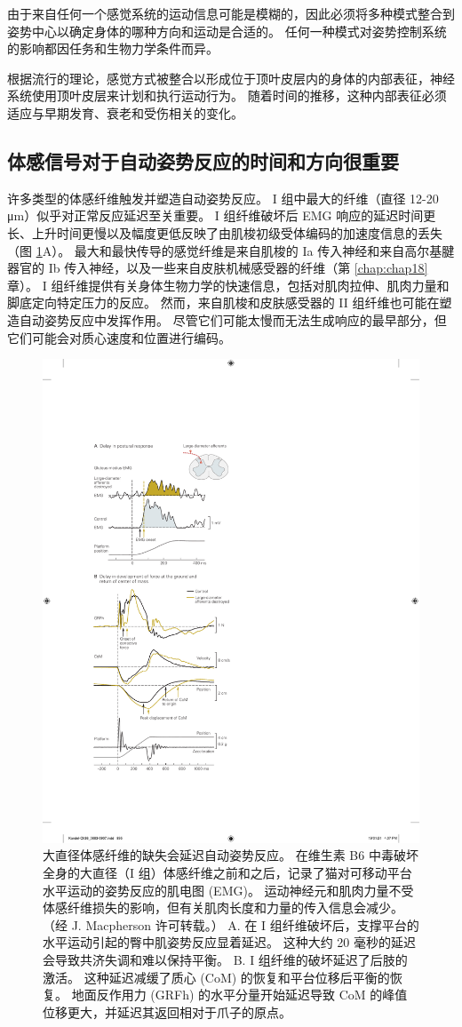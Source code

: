 由于来自任何一个感觉系统的运动信息可能是模糊的，因此必须将多种模式整合到姿势中心以确定身体的哪种方向和运动是合适的。
任何一种模式对姿势控制系统的影响都因任务和生物力学条件而异。


根据流行的理论，感觉方式被整合以形成位于顶叶皮层内的身体的内部表征，神经系统使用顶叶皮层来计划和执行运动行为。
随着时间的推移，这种内部表征必须适应与早期发育、衰老和受伤相关的变化。



\subsection{体感信号对于自动姿势反应的时间和方向很重要}

许多类型的体感纤维触发并塑造自动姿势反应。
I 组中最大的纤维（直径 12-20 μm）似乎对正常反应延迟至关重要。
I 组纤维破坏后 EMG 响应的延迟时间更长、上升时间更慢以及幅度更低反映了由肌梭初级受体编码的加速度信息的丢失（图 \ref{fig:36_9}A）。
最大和最快传导的感觉纤维是来自肌梭的 Ia 传入神经和来自高尔基腱器官的 Ib 传入神经，以及一些来自皮肤机械感受器的纤维（第 \ref{chap:chap18} 章）。
I 组纤维提供有关身体生物力学的快速信息，包括对肌肉拉伸、肌肉力量和脚底定向特定压力的反应。
然而，来自肌梭和皮肤感受器的 II 组纤维也可能在塑造自动姿势反应中发挥作用。
尽管它们可能太慢而无法生成响应的最早部分，但它们可能会对质心速度和位置进行编码。


\begin{figure}[htbp]
	\centering
	\includegraphics[width=0.5\linewidth]{chap36/fig_36_9}
	\caption{大直径体感纤维的缺失会延迟自动姿势反应。 在维生素 B6 中毒破坏全身的大直径（I 组）体感纤维之前和之后，记录了猫对可移动平台水平运动的姿势反应的肌电图 (EMG)。 运动神经元和肌肉力量不受体感纤维损失的影响，但有关肌肉长度和力量的传入信息会减少。 （经 J. Macpherson 许可转载。） A. 在 I 组纤维破坏后，支撑平台的水平运动引起的臀中肌姿势反应显着延迟。 这种大约 20 毫秒的延迟会导致共济失调和难以保持平衡。 B. I 组纤维的破坏延迟了后肢的激活。 这种延迟减缓了质心 (CoM) 的恢复和平台位移后平衡的恢复。 地面反作用力 (GRFh) 的水平分量开始延迟导致 CoM 的峰值位移更大，并延迟其返回相对于爪子的原点。}
	\label{fig:36_9}
\end{figure}


